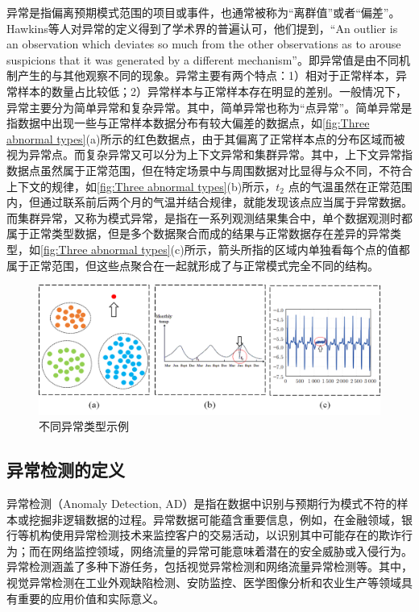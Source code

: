 \documentclass[lang=chs, degree=master, blindreview=false, adobe=false]{yanputhesis}
\begin{document}
异常是指偏离预期模式范围的项目或事件，也通常被称为“离群值”或者“偏差”。Hawkins等人\cite{hawkins1980identification}对异常的定义得到了学术界的普遍认可，他们提到，“An outlier is an observation which deviates so much from the other observations as to arouse suspicions that it was generated by a different mechanism”。即异常值是由不同机制产生的与其他观察不同的现象。异常主要有两个特点：1）相对于正常样本，异常样本的数量占比较低；2）异常样本与正常样本存在明显的差别。一般情况下，异常主要分为简单异常和复杂异常。其中，简单异常也称为“点异常”。简单异常是指数据中出现一些与正常样本数据分布有较大偏差的数据点，如\autoref{fig:Three abnormal types}(a)所示的红色数据点，由于其偏离了正常样本点的分布区域而被视为异常点。而复杂异常又可以分为上下文异常和集群异常。其中，上下文异常指数据点虽然属于正常范围，但在特定场景中与周围数据对比显得与众不同，不符合上下文的规律，如\autoref{fig:Three abnormal types}(b)所示，$t_2$ 点的气温虽然在正常范围内，但通过联系前后两个月的气温并结合规律，就能发现该点应当属于异常数据。而集群异常，又称为模式异常，是指在一系列观测结果集合中，单个数据观测时都属于正常类型数据，但是多个数据聚合而成的结果与正常数据存在差异的异常类型，如\autoref{fig:Three abnormal types}(c)所示，箭头所指的区域内单独看每个点的值都属于正常范围，但这些点聚合在一起就形成了与正常模式完全不同的结构。

\begin{figure}[H]
	\centering
	\includegraphics[width=1\linewidth]{figs/三种异常类型.png}
	\caption{不同异常类型示例}
	\label{fig:Three abnormal types}
\end{figure}


\subsection{异常检测的定义}

异常检测（Anomaly Detection, AD）是指在数据中识别与预期行为模式不符的样本或挖掘非逻辑数据的过程\cite{hodge2004survey}。异常数据可能蕴含重要信息，例如，在金融领域\cite{abd2021deep}，银行等机构使用异常检测技术来监控客户的交易活动，以识别其中可能存在的欺诈行为；而在网络监控领域\cite{simmross2011anomaly}，网络流量的异常可能意味着潜在的安全威胁或入侵行为。异常检测涵盖了多种下游任务，包括视觉异常检测和网络流量异常检测等。其中，视觉异常检测在工业外观缺陷检测\cite{jian2017automatic}、安防监控\cite{sabokrou2018deep}、医学图像分析\cite{roth2015anatomy, schlegl2017unsupervised}和农业生产\cite{kawasaki2015basic}等领域具有重要的应用价值和实际意义。
\end{document}
